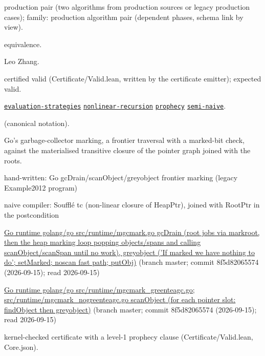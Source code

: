 \documentclass[10pt]{article}
\begin{document}
\begin{description}[leftmargin=2.6cm,style=nextline,itemsep=1pt]

\item[Category] production pair (two algorithms from production sources or legacy production cases); family: production algorithm pair (dependent phases, schema link by view).

\item[Kind] equivalence.

\item[Contributors] Leo Zhang.

\item[Status] certified valid (Certificate/Valid.lean, written by the certificate emitter); expected valid.

\item[Tags] \hyperref[tag:evaluation-strategies]{\texttt{evaluation-strategies}} \hyperref[tag:nonlinear-recursion]{\texttt{nonlinear-recursion}} \hyperref[tag:prophecy]{\texttt{prophecy}} \hyperref[tag:semi-naive]{\texttt{semi-naive}}.

\item[Input]  (canonical notation).

\item[Summary] Go's garbage-collector marking, a frontier traversal with a marked-bit check, against the materialised transitive closure of the pointer graph joined with the roots.

\item[Sides] hand-written: Go gcDrain/scanObject/greyobject frontier marking (legacy Example2012 program) \par naive compiler: Soufflé tc (non-linear closure of HeapPtr), joined with RootPtr in the postcondition

\item[Sources] {\raggedright \href{https://github.com/golang/go/blob/master/src/runtime/mgcmark.go}{Go runtime golang/go src/runtime/mgcmark.go gcDrain (root jobs via markroot, then the heap marking loop popping objects/spans and calling scanObject/scanSpan until no work), greyobject ('If marked we have nothing to do'; setMarked; noscan fast path; putObj)} (branch master; commit 8f5d82065574 (2026-09-15); read 2026-09-15) \par \href{https://github.com/golang/go/blob/master/src/runtime/mgcmark_greenteagc.go}{Go runtime golang/go src/runtime/mgcmark\_greenteagc.go; src/runtime/mgcmark\_nogreenteagc.go scanObject (for each pointer slot: findObject then greyobject)} (branch master; commit 8f5d82065574 (2026-09-15); read 2026-09-15)\par}

\item[Prophecy] kernel-checked certificate with a level-1 prophecy clause (Certificate/Valid.lean, Core.json).

\end{description}
\end{document}
